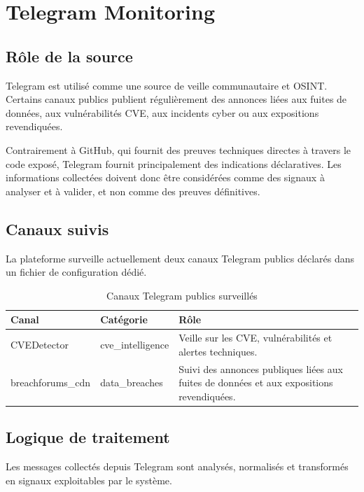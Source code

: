\documentclass[12pt,a4paper]{report}
\renewcommand{\arraystretch}{1.4}
\begin{document}
\newpage
\section{Telegram Monitoring}

\subsection{Rôle de la source}

Telegram est utilisé comme une source de veille communautaire et OSINT. Certains canaux publics publient régulièrement des annonces liées aux fuites de données, aux vulnérabilités CVE, aux incidents cyber ou aux expositions revendiquées.

Contrairement à GitHub, qui fournit des preuves techniques directes à travers le code exposé, Telegram fournit principalement des indications déclaratives. Les informations collectées doivent donc être considérées comme des signaux à analyser et à valider, et non comme des preuves définitives.

\subsection{Canaux suivis}

La plateforme surveille actuellement deux canaux Telegram publics déclarés dans un fichier de configuration dédié.

\begin{table}[H]
\centering
\small
\caption{Canaux Telegram publics surveillés}
\label{tab:telegram-channels}
\renewcommand{\arraystretch}{1.05}
\begin{tabularx}{\linewidth}{|l|l|>{\raggedright\arraybackslash}X|}
\hline
\rowcolor{primary!15}
\textbf{Canal} & \textbf{Catégorie} & \textbf{Rôle} \\ \hline
CVEDetector & cve\_intelligence & Veille sur les CVE, vulnérabilités et alertes techniques. \\ \hline
breachforums\_cdn & data\_breaches & Suivi des annonces publiques liées aux fuites de données et aux expositions revendiquées. \\ \hline
\end{tabularx}
\end{table}

\subsection{Logique de traitement}

Les messages collectés depuis Telegram sont analysés, normalisés et transformés en signaux exploitables par le système.
\end{document}
